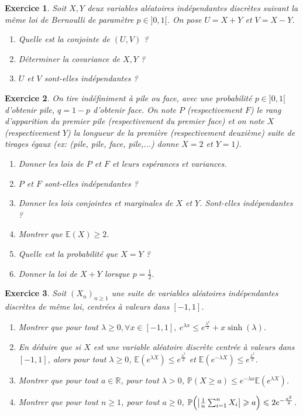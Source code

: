 \documentclass[12pt]{article}
\newtheorem{exercise}{Exercice}[section]
\theoremstyle{remark}
\theoremstyle{remark}
\newcommand{\R}{\mathbb{R}}
\newcommand{\E}{\mathbb{E}}
\renewcommand{\P}{\mathbb{P}}
\begin{document}
\begin{exercise}
	Soit $X,Y$ deux variables aléatoires indépendantes discrètes suivant la même
	loi de Bernoulli de paramètre $p\in]0,1[$. On pose $U=X+Y$ et $V=X-Y$.
	\begin{enumerate}
		\item Quelle est la conjointe de $(U,V)$ ?
		\item Déterminer la covariance de $X,Y$ ?
		\item $U$ et $V$ sont-elles indépendantes ?
	\end{enumerate}
\end{exercise}

\begin{exercise}
	On tire indéfiniment à pile ou face, avec une probabilité $p\in]0,1[$
	d'obtenir pile, $q=1-p$ d'obtenir face. On note $P$ (respectivement $F$) le
	rang d'apparition du premier pile (respectivement du premier face) et on
	note $X$ (respectivement $Y$) la longueur de la première (respectivement
	deuxième) suite de tirages égaux (ex: (pile, pile, face, pile,...) donne $X=2$ et $Y=1$).
	\begin{enumerate}
		\item Donner les lois de $P$ et $F$ et leurs espérances et variances.
		\item $P$ et $F$ sont-elles indépendantes ?
		\item Donner les lois conjointes et marginales de $X$ et $Y$. Sont-elles
		indépendantes ?
		\item Montrer que $\E(X)\geqslant2$.
		\item Quelle est la probabilité que $X=Y$ ?
		\item Donner la loi de $X+Y$ lorsque $p=\frac{1}{2}$.
	\end{enumerate}
\end{exercise}

\begin{exercise}
	Soit $(X_{n})_{n\geqslant1}$ une suite de variables aléatoires indépendantes
	discrètes de même loi, centrées à valeurs dans $[-1,1]$.
	\begin{enumerate}
		\item Montrer que pour tout $\lambda\geqslant0,\forall
		x\in[-1,1],~e^{\lambda x}\leqslant
		e^{\frac{\lambda^{2}}{2}}+x\sinh(\lambda)$.
		\item En déduire que si $X$ est une variable aléatoire discrète centrée
		à valeurs dans $[-1,1]$, alors pour tout $\lambda\geqslant0$,
		$\E(e^{\lambda X})\leqslant e^{\frac{\lambda^{2}}{2}}$ et
		$\E(e^{-\lambda X})\leqslant e^{\frac{\lambda^{2}}{2}}$.
		\item Montrer que pour tout $a\in\R$, pour tout $\lambda>0$,
		$\P(X\geqslant a)\leqslant e^{-\lambda a}\E(e^{\lambda X})$.
		\item Montrer que pour tout $n\geqslant1$, pour tout $a\geqslant0$,
		$\P\Bigl(\bigl\vert\frac{1}{n}\sum_{i=1}^{n}X_{i}\bigr\vert\geqslant
		a\Bigr)\leqslant2e^{-\frac{a^{2}}{2}}$.
	\end{enumerate}
\end{exercise}
\end{document}
